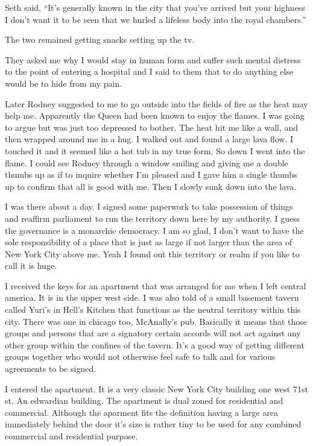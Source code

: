 Seth said, ``It's generally known in the city that you've arrived but your highness I don't want it to be seen that we hurled a lifeless body into the royal chambers.''

The two remained getting snacks setting up the tv.

They asked me why I would stay in human form and suffer such mental distress to the point of entering a hospital and I said to them that to do anything else would be to hide from my pain.

Later Rodney suggested to me to go outside into the fields of fire as the heat may help me. Apparently the Queen had been known to enjoy the flames. I was going to argue but was just too depressed to bother. The heat hit me like a wall, and then wrapped around me in a hug. I walked out and found a large lava flow. I touched it and it seemed like a hot tub in my true form. So down I went into the flame. I could see Rodney through a window smiling and giving me a double thumbs up as if to inquire whether I’m pleased and I gave him a single thumbs up to confirm that all is good with me. Then I slowly sunk down into the lava.

I was there about a day. I signed some paperwork to take possession of things and reaffirm parliament to run the territory down here by my authority. I guess the governance is a monarchic democracy. I am so glad, I don’t want to have the sole responsibility of a place that is just as large if not larger than the area of New York City above me. Yeah I found out this territory or realm if you like to call it is huge.

I received the keys for an apartment that was arranged for me when I left central america. It is in the upper west side. I was also told of a small basement tavern called Yuri’s in Hell’s Kitchen that functions as the neutral territory within this city. There was one in chicago too, McAnally’s pub. Basically it means that those groups and persons that are a signatory certain accords will not act against any other group within the confines of the tavern. It’s a good way of getting different groups together who would not otherwise feel safe to talk and for various agreements to be signed.

\parasep{}

I entered the apartment. It is a very classic New York City building one west 71st st. An edwardian building. The apartment is dual zoned for residential and commercial. Although the aparment fits the definition having a large area immediately behind the door it’s size is rather tiny to be used for any combined commercial and residential purpose.


